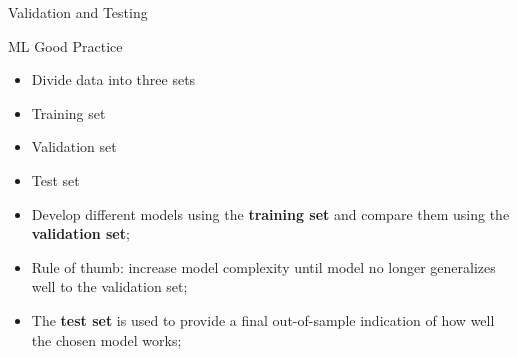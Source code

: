 \documentclass[11pt]{beamer}
\begin{document}
%
%
\begin{frame}{Validation and Testing}

ML Good Practice

	\begin{itemize}
		\item Divide data into three sets
		\item Training set
		\item Validation set
		\item Test set
		\item Develop different models using the \textbf{training set} and compare them using the \textbf{validation set};
		\item Rule of thumb: increase model complexity until model no longer generalizes well to the validation set;
		\item The \textbf{test set} is used to provide a final out-of-sample indication of how well the chosen model works;
	\end{itemize}
\end{frame}
%
\end{document}
